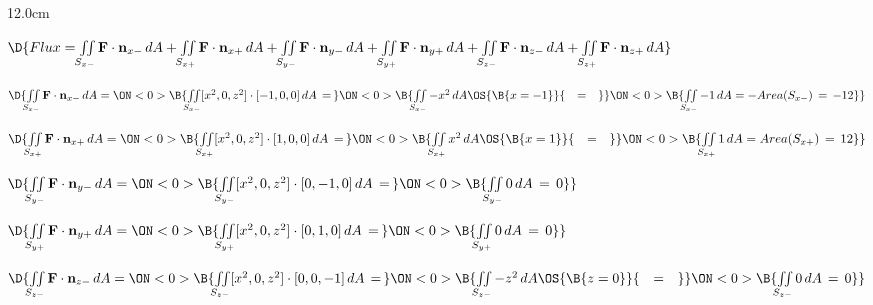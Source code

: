 \begin{frame}
\begin{columns}\begin{column}{12.0cm}
\scriptsize

$\D{Flux = \iint \limits_{S_{x-}} {\bf F} \cdot {\bf n}_{x-}\, dA + \iint \limits_{S_{x+}} {\bf F} \cdot {\bf n}_{x+}\, dA + \iint \limits_{S_{y-}} {\bf F} \cdot {\bf n}_{y-}\, dA + \iint \limits_{S_{y+}} {\bf F} \cdot {\bf n}_{y+}\, dA + \iint \limits_{S_{z-}} {\bf F} \cdot {\bf n}_{z-}\, dA + \iint \limits_{S_{z+}} {\bf F} \cdot {\bf n}_{z+}\, dA}$

\vspace{0.4cm}

$\D{\iint \limits_{S_{x-}} {\bf F} \cdot {\bf n}_{x-}\, dA = 
\ON<0>{\B{\iint \limits_{S_{x-}} [x^2,0,z^2] \cdot [-1,0,0]\, dA \,=\, }}
\ON<0>{\B{\iint \limits_{S_{x-}} -x^2 \, dA \OS{\B{x=-1}}{\quad=\quad} }}
\ON<0>{\B{\iint \limits_{S_{x-}} -1 \, dA = -Area(S_{x-}) \,=\, -12}}}$

\vspace{0.2cm}

$\D{\iint \limits_{S_{x+}} {\bf F} \cdot {\bf n}_{x+}\, dA = 
\ON<0>{\B{\iint \limits_{S_{x+}} [x^2,0,z^2] \cdot [1,0,0]\, dA \,=\, }}
\ON<0>{\B{\iint \limits_{S_{x+}} x^2 \, dA \OS{\B{x=1}}{\quad=\quad} }}
\ON<0>{\B{\iint \limits_{S_{x+}} 1 \, dA = Area(S_{x+}) \,=\, 12}}}$

\vspace{0.2cm}

$\D{\iint \limits_{S_{y-}} {\bf F} \cdot {\bf n}_{y-}\, dA = 
\ON<0>{\B{\iint \limits_{S_{y-}} [x^2,0,z^2] \cdot [0,-1,0]\, dA \,=\,}}
\ON<0>{\B{\iint \limits_{S_{y-}} 0 \, dA \, = \, 0 }}}$

\vspace{0.2cm}

$\D{\iint \limits_{S_{y+}} {\bf F} \cdot {\bf n}_{y+}\, dA = 
\ON<0>{\B{\iint \limits_{S_{y+}} [x^2,0,z^2] \cdot [0,1,0]\, dA \,=\,}}
\ON<0>{\B{\iint \limits_{S_{y+}} 0 \, dA \, = \, 0 }}}$

\vspace{0.2cm}

$\D{\iint \limits_{S_{z-}} {\bf F} \cdot {\bf n}_{z-}\, dA = 
\ON<0>{\B{\iint \limits_{S_{z-}} [x^2,0,z^2] \cdot [0,0,-1]\, dA \,=\, }}
\ON<0>{\B{\iint \limits_{S_{z-}} -z^2 \, dA \OS{\B{z=0}}{\quad=\quad} }}
\ON<0>{\B{\iint \limits_{S_{z-}} 0 \, dA \,=\, 0}}}$

\vspace{0.2cm}


\end{column}
\end{columns}
\end{frame}
